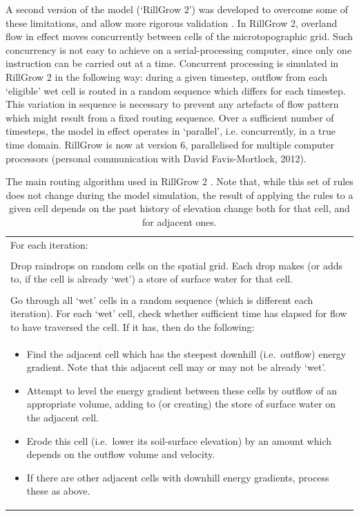 A second version of the model (`RillGrow 2') was developed to overcome some of
these limitations, and allow more rigorous validation
\citep{favis-mortlock2000-2173}. In RillGrow 2, overland flow in effect moves
concurrently between cells of the
microtopographic grid. Such concurrency is not easy to achieve on a
serial-processing computer, since only one instruction can be carried out at a
time. Concurrent processing is simulated in RillGrow 2 in the following way:
during a given timestep, outflow from each `eligible' wet cell is routed in a
random sequence which differs for each timestep. This variation in sequence is
necessary to prevent any artefacts of flow pattern which might result from a
fixed routing sequence. Over a sufficient number of timesteps, the model in
effect operates in `parallel', i.e. concurrently, in a true time domain.
RillGrow is now at version 6, parallelised for multiple computer processors
(personal communication with David Favis-Mortlock, 2012).

\begin{table}[tbp]
  \centering
  \small
  \caption[The main routing algorithm used in RillGrow 2]{The main routing
algorithm used in RillGrow 2 \citep[From][]{favis-mortlock2000-2173}. Note that,
while
this set of rules does not change during the model simulation, the result of
applying the rules to a given cell depends on the past history of elevation
change both for that cell, and for adjacent ones.}
  \label{tab:TheMainRoutingAlgorithmUsedInRillGrow2}
    \begin{tabular}{p{}}
    \toprule
For each iteration:\\
\\
Drop raindrops on random cells on the spatial grid. Each drop makes (or adds to,
if the cell is already `wet') a store of surface water for that cell.\\
\\
Go through all `wet' cells in a random sequence (which is different each
iteration). For each `wet' cell, check whether sufficient time has elapsed for
flow to have traversed the cell. If it has, then do the following:\\
\begin{itemize}
  \item Find the adjacent cell which has the steepest downhill (i.e.\
outflow) energy gradient. Note that this adjacent cell may or may not be already
`wet'.
  \item Attempt to level the energy gradient between these cells by
outflow of an appropriate volume, adding to (or creating) the store of surface
water on the adjacent cell.
  \item Erode this cell (i.e.\ lower its soil-surface elevation) by an
amount which depends on the outflow volume and velocity.
  \item If there are other adjacent cells with downhill energy gradients,
process these as above.
\end{itemize}\\
    \bottomrule
    \end{tabular}
\end{table}

